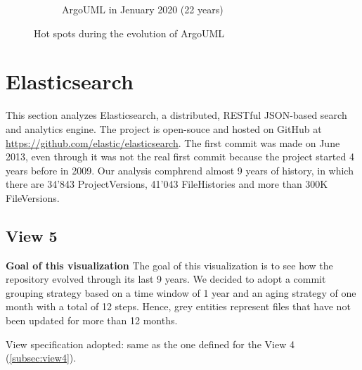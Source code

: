 \begin{figure}[h!]
\begin{subfigure}{0.48\textwidth}
        \caption{ArgoUML in Jenuary 2020 (22 years)} 
        \label{fig:ArgoUML_V3_S6}
    \end{subfigure}
    
    \caption{Hot spots during the evolution of ArgoUML} 
    \label{fig:JetUML_V3}
\end{figure}


\section{Elasticsearch}
This section analyzes Elasticsearch, a distributed, RESTful JSON-based search and analytics engine. 
The project is open-souce and hosted on GitHub at \url{https://github.com/elastic/elasticsearch}. 
The first commit was made on June 2013, even through it was not the real first commit because the project started 4 years before in 2009. 
Our analysis comphrend almost 9 years of history, in which there are 34'843 ProjectVersions, 41'043 FileHistories and more than 300K FileVersions. 

\subsection{View 5}
\textbf{Goal of this visualization}
The goal of this visualization is to see how the repository evolved through its last 9 years. We decided to adopt a commit grouping strategy based on a time window of 1 year and an aging strategy of one month with a total of 12 steps. Hence, grey entities represent files that have not been updated for more than 12 months. 

\bigbreak
View specification adopted: same as the one defined for the View 4 (\autoref{subsec:view4}).


